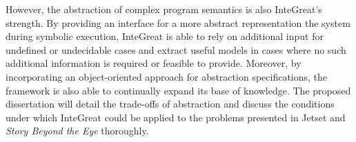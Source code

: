 However, the abstraction of complex program semantics is also InteGreat's strength. 
By providing an interface for a more abstract representation the system during symbolic execution, InteGreat is able to rely on additional input for undefined or undecidable cases and extract useful models in cases where no such additional information is required or feasible to provide.
Moreover, by incorporating an object-oriented approach for abstraction specifications, the framework is also able to continually expand its base of knowledge.
The proposed dissertation will detail the trade-offs of abstraction and discuss the conditions under which InteGreat could be applied to the problems presented in Jetset and \emph{Story Beyond the Eye} thoroughly.
